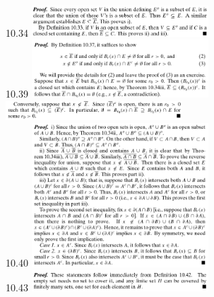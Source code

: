 \documentclass[8pt,landscape]{article}
\begin{document}
\begin{multicols}{3}
    10.34
    \includegraphics[width=250]{10_34.png} \\
    10.39
    \includegraphics[width=250]{10_39a.png} \\
    \includegraphics[width=250]{10_39b.png} \\
    10.40
    \includegraphics[width=250]{10_40.png} \\
    10.43
    \includegraphics[width=250]{10_43.png} \\

\end{multicols}
\end{document}

